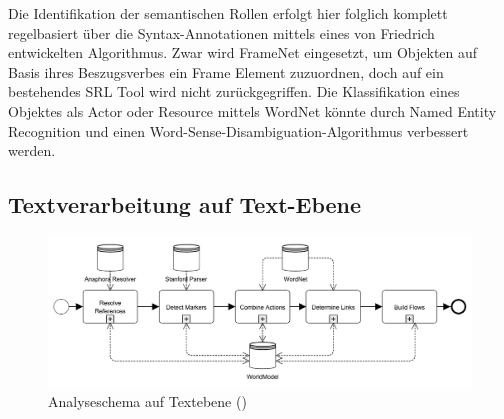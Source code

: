 \par
Die Identifikation der semantischen Rollen erfolgt hier folglich komplett regelbasiert über die Syntax-Annotationen mittels eines von Friedrich entwickelten Algorithmus. Zwar wird FrameNet eingesetzt, um Objekten auf Basis ihres Beszugsverbes ein Frame Element zuzuordnen, doch auf ein bestehendes \ac{SRL} Tool wird nicht zurückgegriffen. Die Klassifikation eines Objektes als Actor oder Resource mittels WordNet könnte durch Named Entity Recognition und einen Word-Sense-Disambiguation-Algorithmus verbessert werden.

\subsection{Textverarbeitung auf Text-Ebene}
\begin{figure}[H]
\begin{center}
\includegraphics[keepaspectratio=true, width=\textwidth]{pictures/textLevel.png}
\caption{Analyseschema auf Textebene (\cite[vgl.][7]{FRIEDRICH2})}
\label{fig:TLEVEL}
\end{center}\end{figure}

